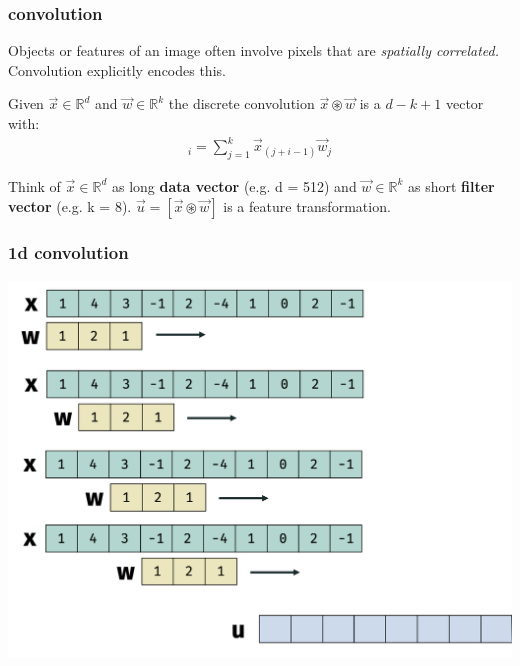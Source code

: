\documentclass[handout,compress]{beamer}
\newcommand{\R}{\mathbb{R}}
\begin{document}
	\begin{frame}
	\frametitle{convolution}
	\small
	Objects or features of an image often involve pixels that are \emph{spatially correlated.} Convolution explicitly encodes this.
	
	\begin{definition}
	Given $\vec{x} \in \R^d$ and $\vec{w} \in \R^k$ the discrete convolution $\vec{x}\circledast\vec{w}$ is a $d - k + 1$ vector with:
	\vspace{-1em}
	\begin{align*}
	[\vec{x}\circledast\vec{w}]_i = \sum_{j=1}^k \vec{x}_{(j+i-1)}\vec{w}_{j}
	\end{align*}
		\vspace{-1em}
	\end{definition}
	Think of $\vec{x} \in \R^d$ as long \textbf{data vector} (e.g. d = 512) and $\vec{w} \in \R^k$ as short \textbf{filter vector} (e.g. k = 8). $\vec{u} = [\vec{x}\circledast\vec{w}]$ is a feature transformation.
	\end{frame}

	\begin{frame}
	\frametitle{1d convolution}
	\includegraphics[width=.9\textwidth]{1d_conv_examp.png}
	\end{frame}
\end{document}
